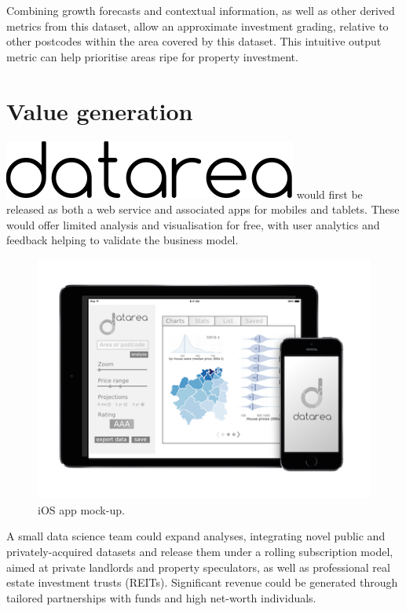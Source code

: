 \documentclass[
10pt, %
a4paper, %
oneside, %
headinclude,footinclude, %
BCOR5mm, %
]{scrartcl}
\newcommand*{\logo}{\includegraphics[scale=.22]{Figures/datarea.pdf}}
\begin{document}
Combining growth forecasts and contextual information, as well as
other derived metrics from this dataset, allow an approximate
investment grading, relative to other postcodes within the area
covered by this dataset. This intuitive output metric can help
prioritise areas ripe for property investment. \\

{\let\thefootnote\relax{}}

\vspace{-2em}
\section{Value generation}

\logo \hspace{.1em} would first be released as both a web service and
associated apps for mobiles and tablets. These would offer limited
analysis and visualisation for free, with user analytics and feedback
helping to validate the business model.

\begin{figure}
\begin{center}
\includegraphics[width=.39\textwidth]{Figures/mockup.png}
\caption{ iOS app mock-up.}
\end{center}
\end{figure}

A small data science team could expand analyses, integrating novel
public and privately-acquired datasets and release them under a
rolling subscription model, aimed at private landlords and property
speculators, as well as professional real estate investment trusts
(REITs). Significant revenue could be generated through tailored
partnerships with funds and high net-worth individuals.
\end{document}
